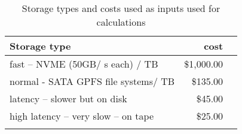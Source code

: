 \tiny \begin{longtable} { |p{}  |r  |r |} 
\caption{Storage types and costs used as inputs used for calculations \label{tab:Storage}}\\ 
\hline 
\textbf{Storage type }&\textbf{cost} \\ \hline
{fast -- NVME (50GB/ s each) / TB  }&{\$1,000.00} \\ \hline
{normal - SATA GPFS file systems/ TB  }&{\$135.00} \\ \hline
{latency -- slower but on disk }&{\$45.00} \\ \hline
{high latency -- very slow -- on tape }&{\$25.00} \\ \hline
{}&{} \\ \hline
\end{longtable} \normalsize
